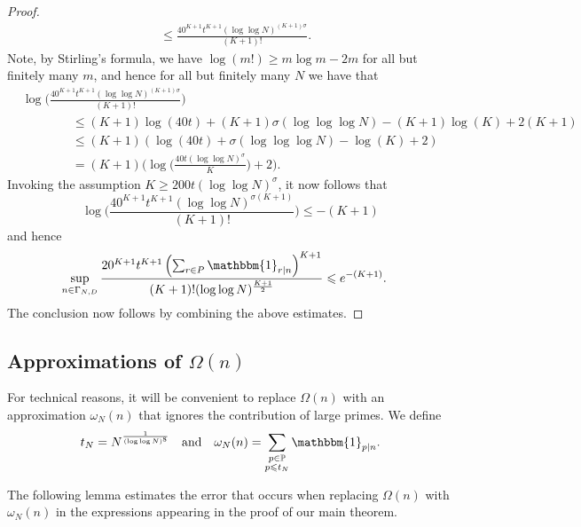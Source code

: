 \documentclass[letter,11pt]{article}
\theoremstyle{plain} %
\theoremstyle{definition} %
\theoremstyle{plain}
\theoremstyle{plain}
\theoremstyle{plain}
\numberwithin{equation}{section}
\renewcommand{\leq}{\leqslant}
\renewcommand{\geq}{\geqslant}
\renewcommand{\P}{\mathbb{P}}
\newcommand{\1}{\mathbbm{1}}
\begin{document}
\begin{proof}
\begin{align*}
&\leq 
\frac{40^{K+1} t^{K+1} (\log\log N)^{(K+1)\sigma} }{(K+1)!}.  
\end{align*}
Note, by Stirling's formula, we have $\log(m!)\geq m\log m-2m$ for all but finitely many $m$, and hence for all but finitely many $N$ we have that
\begin{align*}
&\log\bigg(\frac{40^{K+1} t^{K+1} (\log\log N)^{(K+1)\sigma} }{(K+1)!}\bigg)
\\
&\qquad\qquad\leq (K+1)\log(40t)+ (K+1)\sigma(\log\log\log N)- (K+1)\log(K)+2(K+1)
\\
&\qquad\qquad\leq (K+1)\left(\log(40t)+ \sigma (\log\log\log N)- \log(K)+2\right)
\\
&\qquad\qquad= (K+1)\bigg(\log\bigg(\frac{40 t (\log\log N)^\sigma}{K}\bigg)+2\bigg).
\end{align*}
Invoking the assumption $K\geq 200 t (\log\log N)^\sigma$, it now follows that
\[
\log\bigg(\frac{40^{K+1} t^{K+1} (\log\log N)^{\sigma(K+1)} }{(K+1)!}\bigg)\leq -(K+1)
\]
and hence
\begin{align*}
\sup_{n\in \Gamma_{N,D}} \frac{20^{K+1} t^{K+1} \left(\sum_{r\in P}\1_{r\mid n}\right)^{K+1} }{(K+1)!(\log\log N)^{\frac{K+1}{2}}} 
&\leq e^{-(K+1)}.
\end{align*}
The conclusion now follows by combining the above estimates.
\end{proof}

\subsection{Approximations of $\Omega(n)$}

For technical reasons, it will be convenient to replace $\Omega(n)$ with an approximation $\omega_N(n)$ that ignores the contribution of large primes.
We define 
\begin{equation}\label{omega_N_def}
     t_N=N^{\frac{1}{(\log\log N)^8}}
     \quad\text{and}\quad
     \omega_N(n)=\sum_{\substack{p\in\P \\ p\leq t_N}} \1_{p\mid n}.
\end{equation}

The following lemma estimates the error that occurs when replacing $\Omega(n)$ with $\omega_N(n)$ in the expressions appearing in the proof of our main theorem.
\end{document}
